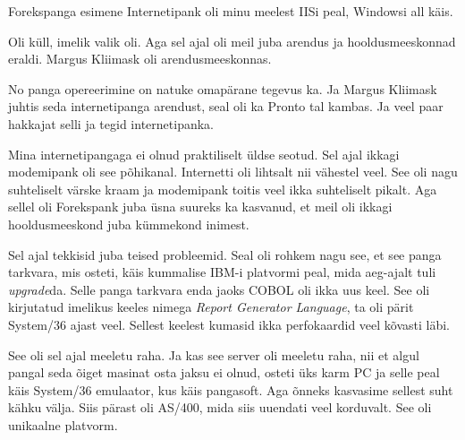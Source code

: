 Forekspanga esimene Internetipank oli minu meelest 
IISi peal, 
Windowsi all käis. 


Oli küll, imelik valik oli. Aga sel ajal oli meil juba arendus ja 
hooldusmeeskonnad eraldi. Margus Kliimask oli 
arendusmeeskonnas. 


No panga opereerimine on natuke omapärane tegevus ka. Ja Margus 
Kliimask juhtis seda internetipanga arendust, seal 
oli ka Pronto tal kambas. Ja  veel paar 
hakkajat selli ja tegid internetipanka. 


Mina internetipangaga ei olnud praktiliselt üldse seotud. Sel ajal ikkagi 
modemipank oli see põhikanal. Internetti oli lihtsalt nii vähestel veel. See 
oli nagu suhteliselt värske kraam ja modemipank toitis veel ikka suhteliselt 
pikalt. Aga sellel oli Forekspank juba üsna suureks ka kasvanud, et meil oli 
ikkagi hooldusmeeskond juba kümmekond inimest.


Sel ajal tekkisid juba teised probleemid. Seal oli rohkem nagu see, et see 
panga tarkvara, mis osteti, käis kummalise IBM-i platvormi peal, mida aeg-ajalt 
tuli \emph{upgrade}da. Selle panga tarkvara enda jaoks COBOL oli ikka uus keel. 
See oli kirjutatud imelikus keeles nimega \emph{Report Generator Language}, ta 
oli pärit System/36 ajast veel. Sellest keelest 
kumasid ikka perfokaardid veel kõvasti läbi.


See oli sel ajal meeletu raha.  Ja kas see server oli meeletu raha, nii et 
algul pangal seda õiget masinat osta jaksu ei olnud, osteti üks karm 
PC ja selle peal käis System/36 emulaator, kus käis 
pangasoft. Aga õnneks kasvasime sellest suht kähku välja. Siis pärast oli 
AS/400, mida siis uuendati veel korduvalt. See oli 
unikaalne platvorm.

